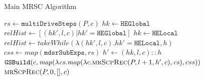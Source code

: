 \documentclass[submission,copyright,creativecommons]{eptcs}
\newif\ifVptVer
\begin{document}
\begin{algorithm}[ht]
  \caption{Main MRSC Algorithm}
  \label{alg:MRSCAlg}
  \begin{algorithmic}[1]
\ifVptVer    
      \Comment{$P$ -- program (function definitions); $l$ -- nesting level; }
      \State \Comment{$h$ -- history (list of tuples: local/global flag; level; configuration); $c$ -- configuration}
\else
      \State {}
      \State {}
      \State {}
\fi      
        \State {}
      \Else
        \State $\mathit{rs} \gets \mathtt{multiDriveSteps}(P, c)$
          \State $\mathit{hk} \gets \mathtt{HEGlobal}$
          \State $\mathit{relHist} \gets [ (\mathit{hk}', l, c) | \mathit{hk}' = \mathtt{HEGlobal} ]$
        \Else
          \State $\mathit{hk} \gets \mathtt{HELocal}$
          \State $\mathit{relHist} \gets \mathit{takeWhile}(\lambda (\mathit{hk}', l, c) . \mathit{hk}' = \mathtt{HELocal}, h)$
        \EndIf
          \State {}
        \Else
          \State $\mathit{css} \gets \mathit{map}(\mathtt{mdsrSubExps}, \mathit{rs})$
          \State $h' \gets (\mathit{hk}, l, c)::h$
          \State \Return $\mathtt{GSBuild}(c, \mathit{map}(\lambda \mathit{cs} . \mathit{map}(\lambda c . \Call{mrScpRec}{P, l+1, h', c}, \mathit{cs}) , css))$
        \EndIf
      \EndIf
    \EndFunction
      \State \Return $\Call{mrScpRec}{P, 0, [], c}$
    \EndFunction
  \end{algorithmic}
\end{algorithm}
\end{document}
